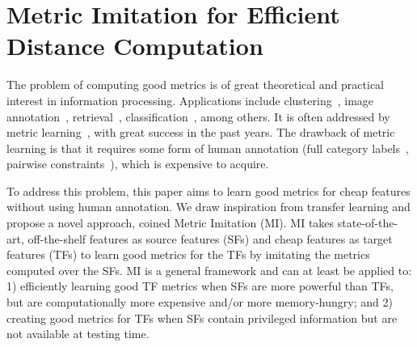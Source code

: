 \chapter{Metric Imitation for Efficient Distance Computation}
\label{ch:mi}

The problem of computing good metrics is of great theoretical and
practical interest in information processing. Applications include
clustering~\citep{metric:nips03, metric:clustering:12}, image
annotation~\citep{tagprop:iccv09},
retrieval~\citep{local_distance:iccv:07, ml:fast:search:09},
classification~\citep{eigenface:pami97, local_distance:iccv:07,
  max:margin:knn}, among others.  It is often addressed by metric
learning~\citep{pairwise:metric:IJCAI09, large:scale:metric:cvpr12,
  tagprop:iccv09, max:margin:knn, qin:bmvc14}, with great success in
the past years. The drawback of metric learning is that it requires
some form of human annotation (\eg full category
labels~\citep{eigenface:pami97, local_distance:iccv:07, max:margin:knn,
  mlrank:10}, pairwise constraints~\citep{pairwise:metric:IJCAI09,
  ml:fast:search:09, large:scale:metric:cvpr12,
  fetlearn:convex:pami14}), which is expensive to acquire.

To address this problem, this paper aims to learn good metrics for cheap features without
using human annotation. We draw inspiration from transfer learning and
propose a novel approach, coined Metric Imitation (MI). 
MI takes state-of-the-art, off-the-shelf features as source features (SFs) and cheap features 
as target features (TFs) to learn good
metrics for the TFs by imitating the metrics computed
over the SFs. MI is a general framework and can at least
be applied to: 1) efficiently learning good TF metrics when
SFs are more powerful than TFs, but are computationally more expensive
and/or more memory-hungry; and 2) creating good metrics for TFs when SFs
contain privileged information but are not available at testing time. 


